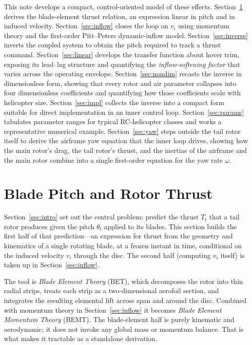 \documentclass[11pt,a4paper]{article}
\newcommand{\Tt}{T_t}
\newcommand{\thetat}{\theta_t}
\newcommand{\vi}{v_i}
\let\oldsection\section
\renewcommand{\section}{\clearpage\oldsection}
\begin{document}
This note develops a compact, control-oriented model of these effects.
Section~\ref{sec:bemt} derives the blade-element thrust relation, an
expression linear in pitch and in induced velocity. Section~\ref{sec:inflow}
closes the loop on \(\vi\) using momentum theory and the first-order
Pitt--Peters dynamic-inflow model. Section~\ref{sec:inverse} inverts the
coupled system to obtain the pitch required to track a thrust command.
Section~\ref{sec:linear} develops the transfer function about hover trim,
exposing its lead--lag structure and quantifying the
\emph{inflow-softening factor} that varies across the operating envelope.
Section~\ref{sec:nondim} recasts the inverse in dimensionless form,
showing that every rotor and air parameter collapses into four
dimensionless coefficients and quantifying how those coefficients scale
with helicopter size. Section~\ref{sec:impl} collects the inverse into a
compact form suitable for direct implementation in an inner control loop. Section~\ref{sec:params}
tabulates parameter ranges for typical RC-helicopter classes and works a
representative numerical example. Section~\ref{sec:yaw} steps outside
the tail rotor itself to derive the airframe yaw equation that the
inner loop drives, showing how the main rotor's drag, the tail rotor's
thrust, and the inertias of the airframe and the main rotor combine
into a single first-order equation for the yaw rate \(\omega\).

\section{Blade Pitch and Rotor Thrust}\label{sec:bemt}

Section~\ref{sec:intro} set out the central problem: predict the thrust
\(\Tt\) that a tail rotor produces given the pitch \(\thetat\) applied
to its blades. This section builds the first half of that prediction---an
expression for thrust from the geometry and kinematics of a single
rotating blade, at a frozen instant in time, conditional on the induced
velocity \(\vi\) through the disc. The second half (computing \(\vi\)
itself) is taken up in Section~\ref{sec:inflow}.

The tool is \emph{Blade Element Theory} (BET), which decomposes the
rotor into thin radial strips, treats each strip as a two-dimensional
aerofoil section, and integrates the resulting elemental lift across
span and around the disc. Combined with momentum theory in
Section~\ref{sec:inflow} it becomes \emph{Blade Element Momentum
Theory} (BEMT). The blade-element half is purely kinematic and
aerodynamic; it does not invoke any global mass or momentum balance.
That is what makes it tractable as a standalone derivation.
\end{document}
